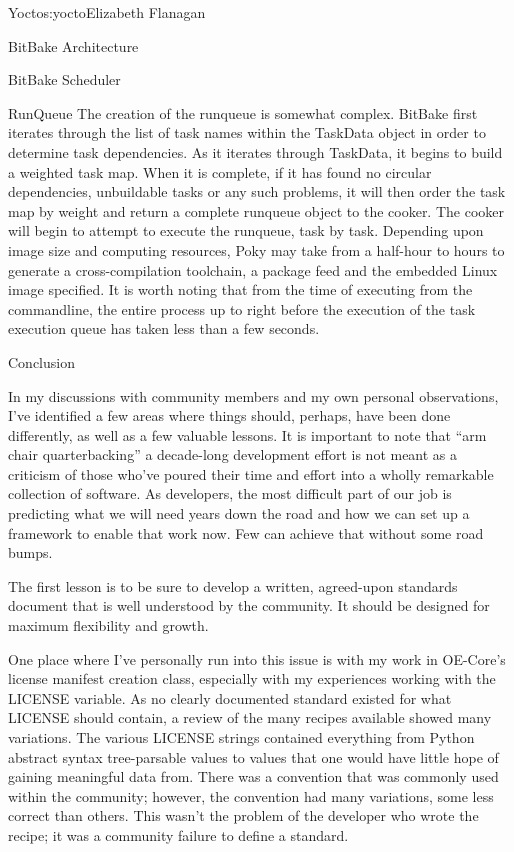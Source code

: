 \begin{aosachapter}{Yocto}{s:yocto}{Elizabeth Flanagan}
\begin{aosasect1}{BitBake Architecture}
\begin{aosasect2}{BitBake Scheduler}
\begin{aosasect3}{RunQueue}
The creation of the runqueue is somewhat complex. BitBake first
iterates through the list of task names within the TaskData object in
order to determine task dependencies. As it iterates through TaskData,
it begins to build a weighted task map. When it is complete, if it has
found no circular dependencies, unbuildable tasks or any such
problems, it will then order the task map by weight and return a
complete runqueue object to the cooker. The cooker will begin to
attempt to execute the runqueue, task by task. Depending upon image
size and computing resources, Poky may take from a half-hour to hours
to generate a cross-compilation toolchain, a package feed and
the embedded Linux image specified. It is worth noting that from the
time of executing  from the commandline,
the entire process up to right before the execution of the task
execution queue has taken less than a few seconds.

\end{aosasect3}

\end{aosasect2}

\end{aosasect1}

\begin{aosasect1}{Conclusion}

In my discussions with community members and my own personal
observations, I've identified a few areas where things should, perhaps, have
been done differently, as well as a few valuable lessons. It is
important to note that ``arm chair quarterbacking'' a decade-long
development effort is not meant as a criticism of those who've poured
their time and effort into a wholly remarkable collection of
software. As developers, the most difficult part of our job is
predicting what we will need years down the road and how we can set up
a framework to enable that work now. Few can achieve that without
some road bumps.

The first lesson is to be sure to develop a
written, agreed-upon standards document that is well understood 
by the community. It should be designed for maximum
flexibility and growth. 

One place where I've personally run into this
issue is with my work in OE-Core's license manifest creation class,
especially with my experiences working with the LICENSE variable.
As no clearly documented standard existed for what LICENSE should
contain, a review of the many recipes available showed many
variations. The various LICENSE strings contained everything from
Python abstract syntax tree-parsable values to values that one would
have little hope of gaining meaningful data from. There was a
convention that was commonly used within the community; however, the
convention had many variations, some less correct than others. This
wasn't the problem of the developer who wrote the recipe; it was a
community failure to define a standard.


\end{aosasect1}
\end{aosachapter}
